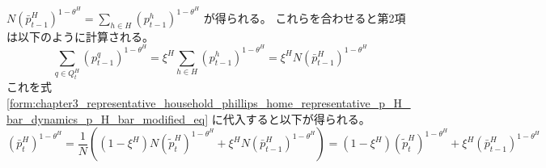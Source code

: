 \(N(\bar{p}_{t-1}^H)^{1-\theta^H}=\sum_{h\in H}(p_{t-1}^h)^{1-\theta^H}\)
が得られる。
これらを合わせると第2項は以下のように計算される。
\begin{equation}
\label{form:chapter3_representative_household_phillips_home_representative_p_H_bar_dynamics_p_H_bar_modified_second_term_eq}
    \sum_{q\in Q_t^H} (p_{t-1}^q)^{1-\theta^H}
    =\xi^H \sum_{h\in H} (p_{t-1}^h)^{1-\theta^H}
    =\xi^H N(\bar{p}_{t-1}^H)^{1-\theta^H}
\end{equation}
これを式
\eqref{form:chapter3_representative_household_phillips_home_representative_p_H_bar_dynamics_p_H_bar_modified_eq}
に代入すると以下が得られる。
\begin{equation}
\label{form:chapter3_representative_household_phillips_home_representative_p_H_bar_dynamics_p_H_bar_modified2_eq}
    (\bar{p}_t^H)^{1-\theta^H}
    =\frac{1}{N}
     \left((1-\xi^H)N(\widetilde{p}_t^H)^{1-\theta^H}+\xi^H N(\bar{p}_{t-1}^H)^{1-\theta^H}\right)
    =(1-\xi^H)(\widetilde{p}_t^H)^{1-\theta^H}+\xi^H(\bar{p}_{t-1}^H)^{1-\theta^H}
\end{equation}

